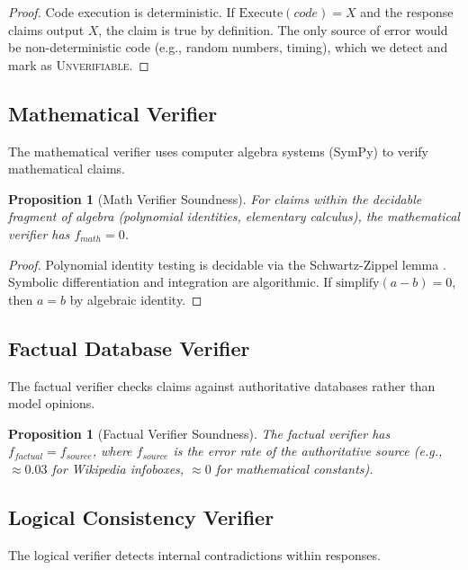 \documentclass[11pt,a4paper]{article}
\newtheorem{proposition}[theorem]{Proposition}
\begin{document}
\begin{proof}
Code execution is deterministic. If $\text{Execute}(code) = X$ and the response claims output $X$, the claim is true by definition. The only source of error would be non-deterministic code (e.g., random numbers, timing), which we detect and mark as \textsc{Unverifiable}.
\end{proof}

\subsection{Mathematical Verifier}
\label{sec:math}

The mathematical verifier uses computer algebra systems (SymPy) to verify mathematical claims.

\begin{proposition}[Math Verifier Soundness]
\label{prop:math}
For claims within the decidable fragment of algebra (polynomial identities, elementary calculus), the mathematical verifier has $f_{math} = 0$.
\end{proposition}

\begin{proof}
Polynomial identity testing is decidable via the Schwartz-Zippel lemma \citep{schwartz1980fast}. Symbolic differentiation and integration are algorithmic. If $\text{simplify}(a - b) = 0$, then $a = b$ by algebraic identity.
\end{proof}

\subsection{Factual Database Verifier}
\label{sec:factual}

The factual verifier checks claims against authoritative databases rather than model opinions.

\begin{proposition}[Factual Verifier Soundness]
\label{prop:factual}
The factual verifier has $f_{factual} = f_{source}$, where $f_{source}$ is the error rate of the authoritative source (e.g., $\approx 0.03$ for Wikipedia infoboxes, $\approx 0$ for mathematical constants).
\end{proposition}

\subsection{Logical Consistency Verifier}
\label{sec:logic}

The logical verifier detects internal contradictions within responses.
\end{document}
